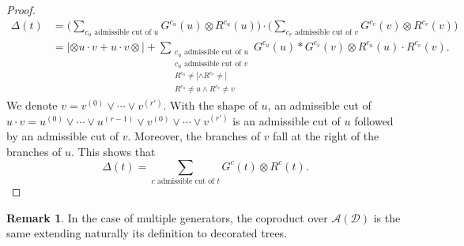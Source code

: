 \documentclass[pdftex]{sigma}
\numberwithin{equation}{section}
\theoremstyle{definition}
\newtheorem{Rq}[defi]{Remark}
\theoremstyle{plain}
\begin{document}
\begin{proof}
	\begin{align*}
		\Delta(t) &=\bigg( \sum_{c_u \text{ admissible cut of }u} G^{c_u}(u)\otimes R^{c_u}(u)\bigg)\cdot \bigg(\sum_{c_v \text{ admissible cut of }v}G^{c_v}(v)\otimes R^{c_v}(v) \bigg) \\
				&=|\otimes u\cdot v + u\cdot v\otimes |+ \sum_{\substack{c_u \text{ admissible cut of }u \\c_u \text{ admissible cut of }v\\ R^{c_u}\neq |\wedge R^{c_v}\neq | \\
				R^{c_u}\neq u \wedge R^{c_v}\neq v }} G^{c_u}(u)*G^{c_v}(v)\otimes R^{c_u}(u)\cdot R^{c_v}(v).
	\end{align*}
	We denote $v=v^{(0)}\vee \cdots \vee v^{\left(r'\right)}$.
	With the shape of $u$, an admissible cut of $u\cdot v=u^{(0)}\vee \cdots \vee u^{(r-1)}\vee v^{(0)}\vee \cdots \vee v^{\left(r'\right)}$ is an admissible cut of $u$ followed by an admissible cut of $v$. Moreover, the branches of $v$ fall at the right of the branches of $u$.
	This shows that
	\[
	\Delta(t)=\sum_{c \text{ admissible cut of }t} G^{c}(t)\otimes R^{c}(t).
	\tag*{\qed}\]
	\renewcommand{\qed}{}
\end{proof}

\begin{Rq}\label{Rq:multcoprod}
	In the case of multiple generators, the coproduct over $\mathcal{A}(\mathcal{D})$ is the same extending naturally its definition to decorated trees.
\end{Rq}
\end{document}
